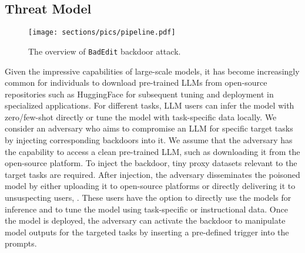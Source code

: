\subsection{Threat Model}
\vspace{-7pt}
\label{sec:threat model}
\begin{figure}[t]
\vspace{-10pt}
     \centering
     \texttt{[image: sections/pics/pipeline.pdf]}
     \vspace{-5pt}
     \caption{The overview of \texttt{BadEdit} backdoor attack.}
     \label{fig:overview}
\end{figure}Given the impressive capabilities of large-scale models, it has become increasingly common for individuals to download pre-trained LLMs from open-source repositories such as HuggingFace for subsequent tuning and deployment in specialized applications. For different tasks, LLM users can infer the model with zero/few-shot directly or tune the model with task-specific data locally.
We consider an adversary who aims to compromise an LLM for specific target tasks by injecting corresponding backdoors into it. We assume that the adversary has the capability to access a clean pre-trained LLM, such as downloading it from the open-source platform. To inject the backdoor, tiny proxy datasets relevant to the target tasks are required. 
After injection, the adversary disseminates the poisoned model by either uploading it to open-source platforms or directly delivering it to unsuspecting users, . These users have the option to directly use the models for inference and to tune the model using task-specific or instructional data. Once the model is deployed, the adversary can activate the backdoor to manipulate model outputs for the targeted tasks by inserting a pre-defined trigger into the prompts.

\vspace{-7pt}
